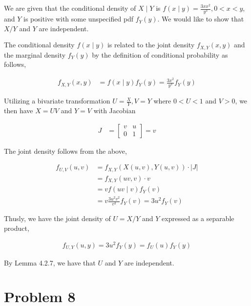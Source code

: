 \documentclass[11pt]{article}
\begin{document}
We are given that the conditional density of $X \mid Y$ is $f(x \mid
y) = \frac{3xx^2}{y^3}, 0<x<y$, and $Y$ is positive with some
unspecified pdf $f_Y(y)$.  We would like to show that $X/Y$ and $Y$
are independent.

The conditional density $f(x \mid y)$ is related to the joint density
$f_{X,Y}(x,y)$ and the marginal density $f_Y(y)$ by the definition of
conditional probability as follows,

\begin{align*}
  f_{X,Y}(x,y) &= f(x \mid y) f_Y(y) = \frac{3x^2}{y^3} f_Y(y)
\end{align*}

Utilizing a bivariate transformation $U = \frac{X}{Y}, V = Y$ where
$0<U<1$ and $V>0$, we then have $X = UV$ and $Y=V$ with Jacobian

\begin{align*}
  J &= \begin{bmatrix} v & u \\ 0 & 1 \end{bmatrix} = v
\end{align*}

The joint density follows from the above,

\begin{align*}
  f_{U,V} (u,v) &= f_{X,Y}(X(u,v), Y(u,v)) \cdot \left| J \right| \\
  &= f_{X,Y}(uv, v) \cdot v \\
  &= v f(uv \mid v) f_Y(v) \\
  &= v \frac{3u^2v^2}{v^3} f_Y(v) = 3u^2 f_Y(v)
\end{align*}

Thusly, we have the joint density of $U = X/Y$ and $Y$ expressed as a
separable product,

\begin{align*}
  f_{U,Y}(u,y) = 3u^2 f_Y(y) = f_U(u) f_Y(y)
\end{align*}

By Lemma 4.2.7, we have that $U$ and $Y$ are independent.

\section*{Problem 8}
\end{document}
